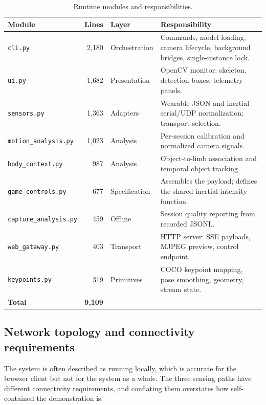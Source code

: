 \documentclass[11pt,a4paper]{article}
\newcommand{\code}[1]{\texttt{\small #1}}
\begin{document}
\begin{table}[H]
\centering
\small
\caption{Runtime modules and responsibilities.}
\label{tab:modules}
\begin{tabularx}{\textwidth}{@{}L{3.9cm} r L{2.6cm} Y@{}}
\toprule
\textbf{Module} & \textbf{Lines} & \textbf{Layer} & \textbf{Responsibility} \\
\midrule
\code{cli.py} & 2{,}180 & Orchestration & Commands, model loading, camera lifecycle, background bridges, single-instance lock. \\
\code{ui.py} & 1{,}682 & Presentation & OpenCV monitor: skeleton, detection boxes, telemetry panels. \\
\code{sensors.py} & 1{,}363 & Adapters & Wearable JSON and inertial serial/UDP normalization; transport selection. \\
\code{motion\_analysis.py} & 1{,}023 & Analysis & Per-session calibration and normalized camera signals. \\
\code{body\_context.py} & 987 & Analysis & Object-to-limb association and temporal object tracking. \\
\code{game\_controls.py} & 677 & Specification & Assembles the payload; defines the shared inertial intensity function. \\
\code{capture\_analysis.py} & 459 & Offline & Session quality reporting from recorded JSONL. \\
\code{web\_gateway.py} & 403 & Transport & HTTP server: SSE payloads, MJPEG preview, control endpoint. \\
\code{keypoints.py} & 319 & Primitives & COCO keypoint mapping, pose smoothing, geometry, stream state. \\
\midrule
\textbf{Total} & \textbf{9{,}109} & & \\
\bottomrule
\end{tabularx}
\end{table}

\subsection{Network topology and connectivity requirements}
\label{sec:network}

The system is often described as running locally, which is accurate for the
browser client but not for the system as a whole. The three sensing paths have
different connectivity requirements, and conflating them overstates how
self-contained the demonstration is.
\end{document}
